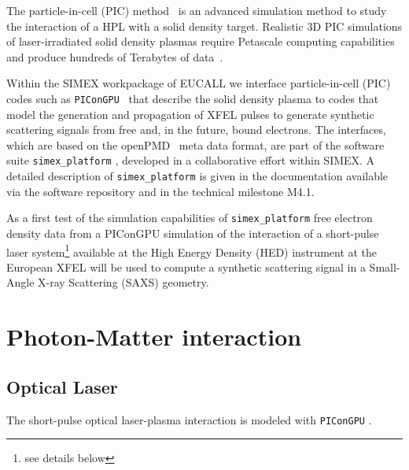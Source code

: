 \documentclass[10pt]{scrartcl}
\begin{document}
The particle-in-cell (PIC) method~\cite{Birdsall2004} is an advanced simulation
method to study the interaction of a HPL with a solid density
target. Realistic 3D PIC simulations of laser-irradiated solid
density plasmas require Petascale computing capabilities and produce hundreds of
Terabytes of data~\cite{ornl_picongpu}.

Within the SIMEX workpackage of EUCALL we interface particle-in-cell (PIC) codes
such as \texttt{PIConGPU}~\cite{Bussmann2013, picongpu_github} that describe the solid density plasma to codes that
model the generation and propagation of XFEL pulses to
generate synthetic scattering signals from free and, in the future, bound
electrons. The interfaces, which are based on the openPMD~\cite{openPMD} meta data format, are
part of the software suite \texttt{simex\_platform} \cite{simex_github},
developed in a collaborative effort within SIMEX. A detailed description of
\texttt{simex\_platform} is given in the documentation available via the
software repository \cite{simex_github} and in the technical
milestone M4.1.

As a first test of the simulation capabilities of \texttt{simex\_platform}
free electron density data from a PIConGPU simulation of the interaction of a
short-pulse laser system\footnote{see details below} available at the High
Energy Density (HED) instrument \cite{Nakatsutsumi2014} at the European XFEL
will be used to compute a synthetic scattering signal in a Small-Angle X-ray
Scattering (SAXS) geometry.
%
\section{Photon-Matter interaction}
\subsection{Optical Laser}
The short-pulse
optical laser-plasma interaction is modeled with \texttt{PIConGPU}
\cite{Bussmann2013}.
\end{document}
